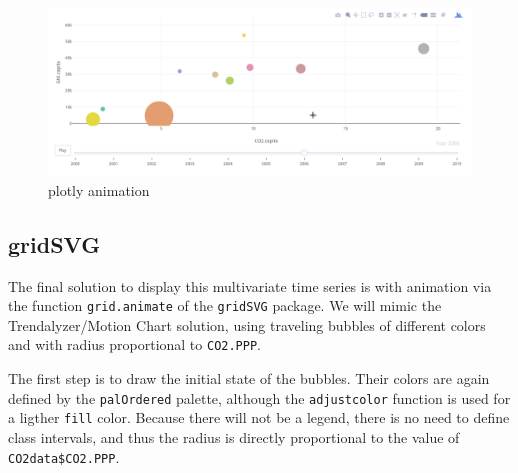 \documentclass[smallroyalvopaper]{memoir}
\begin{document}
\begin{figure}[htbp]
\centering
\includegraphics[width=.9\linewidth]{figs/plotly_animation.png}
\caption{plotly animation \label{fig:plotly_animation}}
\end{figure}

\subsection{\floweroneleft gridSVG}
\label{sec:org00d79b1}
The final solution to display this multivariate time series is with
animation via the function \texttt{grid.animate} of the \texttt{gridSVG}
package. We will mimic the Trendalyzer/Motion Chart solution, using
traveling bubbles of different colors and with radius proportional to
\texttt{CO2.PPP}.

The first step is to draw the initial state of the bubbles. Their
colors are again defined by the \texttt{palOrdered} palette, although the
\texttt{adjustcolor} function is used for a ligther \texttt{fill} color. Because
there will not be a legend, there is no need to define class
intervals, and thus the radius is directly proportional to the value
of \texttt{CO2data\$CO2.PPP}.

\end{document}
